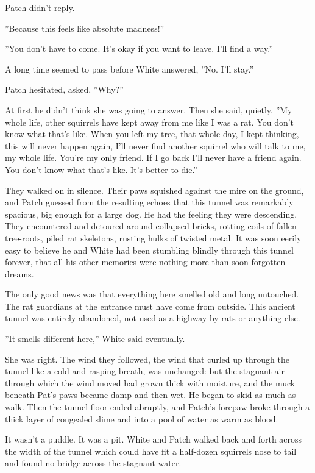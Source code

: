 \documentclass[12pt]{book}
\begin{document}
Patch didn't reply.

''Because this feels like absolute madness!''

''You don't have to come. It's okay if you want to leave. I'll find a way.''

A long time seemed to pass before White answered, ''No. I'll stay.''

Patch hesitated, asked, ''Why?''

At first he didn't think she was going to answer. Then she said, quietly, ''My whole life, other squirrels have kept away from me like I was a rat. You don't know what that's like. When you left my tree, that whole day, I kept thinking, this will never happen again, I'll never find another squirrel who will talk to me, my whole life. You're my only friend. If I go back I'll never have a friend again. You don't know what that's like. It's better to die.''

They walked on in silence. Their paws squished against the mire on the ground, and Patch guessed from the resulting echoes that this tunnel was remarkably spacious, big enough for a large dog. He had the feeling they were descending. They encountered and detoured around collapsed bricks, rotting coils of fallen tree-roots, piled rat skeletons, rusting hulks of twisted metal. It was soon eerily easy to believe he and White had been stumbling blindly through this tunnel forever, that all his other memories were nothing more than soon-forgotten dreams.

The only good news was that everything here smelled old and long untouched. The rat guardians at the entrance must have come from outside. This ancient tunnel was entirely abandoned, not used as a highway by rats or anything else.

''It smells different here,'' White said eventually.

She was right. The wind they followed, the wind that curled up through the tunnel like a cold and rasping breath, was unchanged: but the stagnant air through which the wind moved had grown thick with moisture, and the muck beneath Pat's paws became damp and then wet. He began to skid as much as walk. Then the tunnel floor ended abruptly, and Patch's forepaw broke through a thick layer of congealed slime and into a pool of water as warm as blood.

It wasn't a puddle. It was a pit. White and Patch walked back and forth across the width of the tunnel %
which could have fit a half-dozen squirrels nose to tail %
and found no bridge across the stagnant water.
\end{document}
